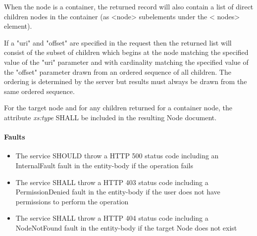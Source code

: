 \documentclass[11pt,a4paper]{ivoa}
\begin{document}
When the node is a container, the returned record will also contain a list of direct children nodes in the container (as <node> subelements under the < nodes> element).

If a "uri" and "offset" are specified in the request then the returned list will consist of the subset of children which begins at the node matching the specified value of the "uri" parameter and with cardinality matching the specified value of the "offset" parameter drawn from an ordered sequence of all children. The ordering is determined by the server but results must always be drawn from the same ordered sequence.

For the target node and for any children returned for a container node, the attribute \emph{xs:type} SHALL be included in the resulting Node document.  

\paragraph{Faults}
\begin{itemize}
    \item The service SHOULD throw a HTTP 500 status code including an InternalFault fault in the entity-body if the operation fails
    \item The service SHALL throw a HTTP 403 status code including a PermissionDenied fault in the entity-body if the user does not have permissions to perform the operation
    \item The service SHALL throw a HTTP 404 status code including a NodeNotFound fault in the entity-body if the target Node does not exist
\end{itemize}
\end{document}
